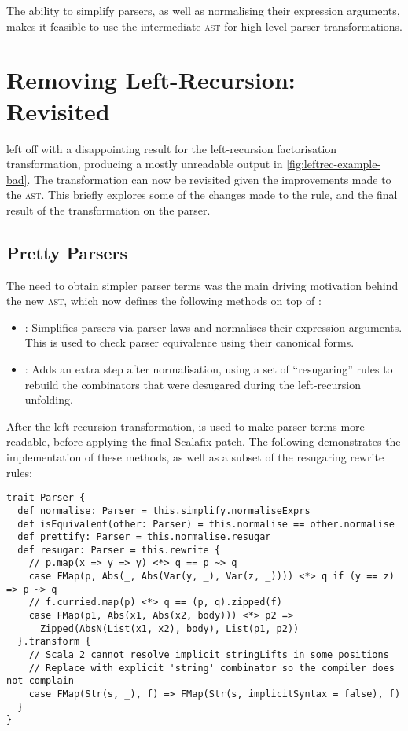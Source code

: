 \documentclass[../../main.tex]{subfiles}
\begin{document}
\label{sec:complex-rules}
The ability to simplify parsers, as well as normalising their expression arguments, makes it feasible to use the intermediate  \textsc{ast} for high-level parser transformations.

\section{Removing Left-Recursion: Revisited}\label{sec:leftrec-revisited}
 left off with a disappointing result for the left-recursion factorisation transformation, producing a mostly unreadable output in \cref{fig:leftrec-example-bad}.
The transformation can now be revisited given the improvements made to the  \textsc{ast}.
This  briefly explores some of the changes made to the rule, and the final result of the transformation on the  parser.

\subsection{Pretty Parsers}
The need to obtain simpler parser terms was the main driving motivation behind the new  \textsc{ast}, which now defines the following methods on top of :
\begin{itemize}
  \item {}: Simplifies parsers via parser laws and normalises their expression arguments. This is used to check parser equivalence using their canonical forms.
  \item {}: Adds an extra step after normalisation, using a set of ``resugaring'' rules to rebuild the combinators that were desugared during the left-recursion unfolding.
\end{itemize}
%
After the left-recursion transformation,  is used to make parser terms more readable, before applying the final Scalafix patch.
The following demonstrates the implementation of these methods, as well as a subset of the resugaring rewrite rules:
\begin{verbatim}
trait Parser {
  def normalise: Parser = this.simplify.normaliseExprs
  def isEquivalent(other: Parser) = this.normalise == other.normalise
  def prettify: Parser = this.normalise.resugar
  def resugar: Parser = this.rewrite {
    // p.map(x => y => y) <*> q == p ~> q
    case FMap(p, Abs(_, Abs(Var(y, _), Var(z, _)))) <*> q if (y == z) => p ~> q
    // f.curried.map(p) <*> q == (p, q).zipped(f)
    case FMap(p1, Abs(x1, Abs(x2, body))) <*> p2 =>
      Zipped(AbsN(List(x1, x2), body), List(p1, p2))
  }.transform {
    // Scala 2 cannot resolve implicit stringLifts in some positions
    // Replace with explicit 'string' combinator so the compiler does not complain
    case FMap(Str(s, _), f) => FMap(Str(s, implicitSyntax = false), f)
  }
}
\end{verbatim}
\end{document}
